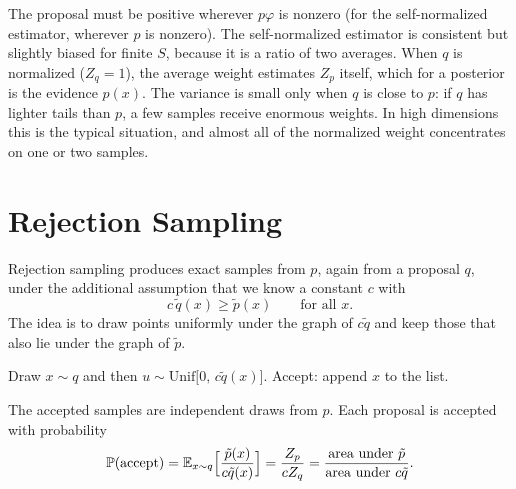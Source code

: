 The proposal must be positive wherever $p\varphi$ is nonzero (for the self-normalized estimator, wherever $p$ is nonzero). The self-normalized estimator is consistent but slightly biased for finite $S$, because it is a ratio of two averages. When $q$ is normalized ($Z_q=1$), the average weight estimates $Z_p$ itself, which for a posterior is the evidence $p(x)$. The variance is small only when $q$ is close to $p$: if $q$ has lighter tails than $p$, a few samples receive enormous weights. In high dimensions this is the typical situation, and almost all of the normalized weight concentrates on one or two samples.

\section{Rejection Sampling}\label{sec:rejection-sampling}

Rejection sampling produces exact samples from $p$, again from a proposal $q$, under the additional assumption that we know a constant $c$ with
\[
c\,\tilde q(x)\ge\tilde p(x)\qquad\text{for all }x.
\]
The idea is to draw points uniformly under the graph of $c\tilde q$ and keep those that also lie under the graph of $\tilde p$.

\begin{algorithm}[H]
\caption{Rejection Sampling}\label{alg:rejection}
\begin{algorithmic}[1]
  \State Draw $x\sim q$ and then $u\sim\mathrm{Unif}\big[0,\,c\tilde q(x)\big]$.
    \State Accept: append $x$ to the list. 
  \EndIf
\EndWhile
{}
\end{algorithmic}
\end{algorithm}

\begin{proposition}\label{prop:rejection}
The accepted samples are independent draws from $p$. Each proposal is accepted with probability
\[
\mathbb{P}(\text{accept})=\mathbb{E}_{x\sim q}\Big[\frac{\tilde p(x)}{c\tilde q(x)}\Big]=\frac{Z_p}{cZ_q}=\frac{\text{area under }\tilde p}{\text{area under }c\tilde q}.
\]
\end{proposition}

